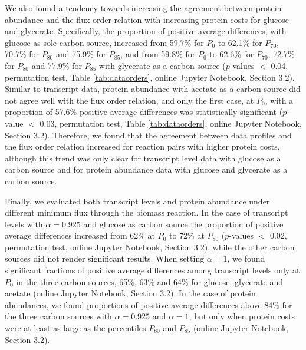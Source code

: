 \documentclass[12pt]{article}
\begin{document}
We also found a tendency towards increasing the agreement between protein abundance and the flux order relation with increasing protein costs for glucose and glycerate. Specifically, the proportion of positive average differences, with glucose as sole carbon source, increased from 59.7\% for $P_{0}$ to 62.1\% for $P_{70}$, 70.7\% for $P_{80}$ and 75.9\% for $P_{85}$, and from 59.8\% for $P_{0}$ to 62.6\% for $P_{70}$, 72.7\% for $P_{80}$ and 77.9\% for $P_{85}$ with glycerate as a carbon source ($p$-values $<$ 0.04, permutation test, Table \ref{tab:dataorders}, online Jupyter Notebook, Section 3.2). Similar to transcript data, protein abundance with acetate as a carbon source did not agree well with the flux order relation, and only the first case, at $P_{0}$, with a proportion of 57.6\% positive average differences was statistically significant ($p$-value $<$ 0.03, permutation test, Table \ref{tab:dataorders}, online Jupyter Notebook, Section 3.2). Therefore, we found that the agreement between data profiles and the flux order relation increased for reaction pairs with higher protein costs, although this trend was only clear for transcript level data with glucose as a carbon source and for protein abundance data with glucose and glycerate as a carbon source.

Finally, we evaluated both transcript levels and protein abundance under different minimum flux through the biomass reaction. In the case of transcript levels with $\alpha=0.925$ and glucose as carbon source the proportion of positive average differences increased from 62\% at $P_0$ to 72\% at $P_{80}$ ($p$-values $<$ 0.02, permutation test, online Jupyter Notebook, Section 3.2), while the other carbon sources did not render significant results. When setting $\alpha = 1$, we found significant fractions of positive average differences among transcript levels only at $P_0$ in the three carbon sources, 65\%, 63\% and 64\% for glucose, glycerate and acetate (online Jupyter Notebook, Section 3.2). In the case of protein abundances, we found proportions of positive average differences above 84\% for the three carbon sources with $\alpha=0.925$ and $\alpha=1$, but only when protein costs were at least as large as the percentiles $P_{80}$ and $P_{85}$ (online Jupyter Notebook, Section 3.2).
\end{document}
